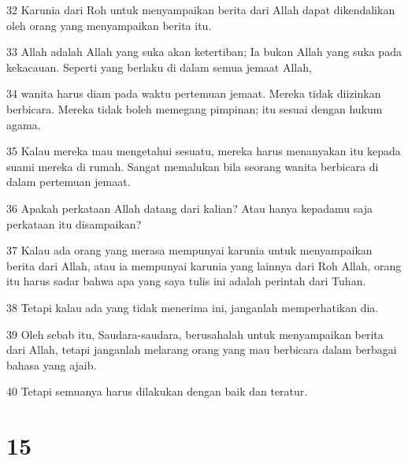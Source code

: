 \par 32 Karunia dari Roh untuk menyampaikan berita dari Allah dapat dikendalikan oleh orang yang menyampaikan berita itu.
\par 33 Allah adalah Allah yang suka akan ketertiban; Ia bukan Allah yang suka pada kekacauan. Seperti yang berlaku di dalam semua jemaat Allah,
\par 34 wanita harus diam pada waktu pertemuan jemaat. Mereka tidak diizinkan berbicara. Mereka tidak boleh memegang pimpinan; itu sesuai dengan hukum agama.
\par 35 Kalau mereka mau mengetahui sesuatu, mereka harus menanyakan itu kepada suami mereka di rumah. Sangat memalukan bila seorang wanita berbicara di dalam pertemuan jemaat.
\par 36 Apakah perkataan Allah datang dari kalian? Atau hanya kepadamu saja perkataan itu disampaikan?
\par 37 Kalau ada orang yang merasa mempunyai karunia untuk menyampaikan berita dari Allah, atau ia mempunyai karunia yang lainnya dari Roh Allah, orang itu harus sadar bahwa apa yang saya tulis ini adalah perintah dari Tuhan.
\par 38 Tetapi kalau ada yang tidak menerima ini, janganlah memperhatikan dia.
\par 39 Oleh sebab itu, Saudara-saudara, berusahalah untuk menyampaikan berita dari Allah, tetapi janganlah melarang orang yang mau berbicara dalam berbagai bahasa yang ajaib.
\par 40 Tetapi semuanya harus dilakukan dengan baik dan teratur.

\chapter{15}

